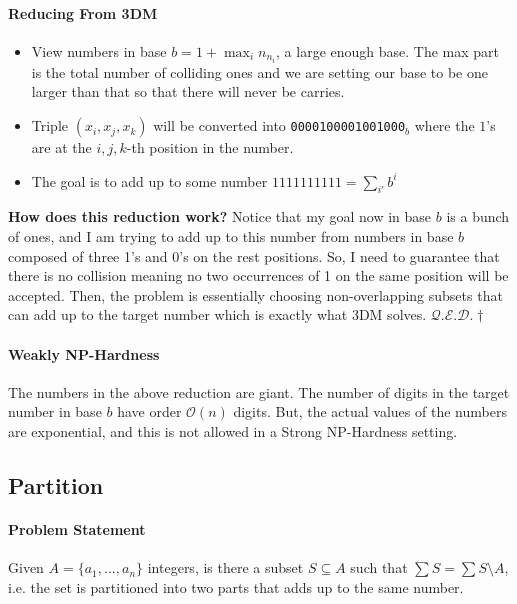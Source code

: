 \documentclass[10pt]{article}
\newcommand{\qed}{\hfill $\mathcal{Q}.\mathcal{E}.\mathcal{D}.\dagger$}
\begin{document}
\paragraph{Reducing From 3DM}
\begin{itemize}
    \item View numbers in base $b = 1 + \max_i n_{n_i}$, a large enough base. The max part is the total number of colliding ones and we are setting our base to be one larger than that so that there will never be carries. 
    \item Triple $(x_i, x_j, x_k)$ will be converted into \texttt{0000100001001000$_b$} where the $1$'s are at the $i,j,k$-th position in the number.
    \item The goal is to add up to some number $1111111111 = \sum_{i'} b^{i}$
\end{itemize}
\textbf{How does this reduction work?} Notice that my goal now in base $b$ is a bunch of ones, and I am trying to add up to this number from numbers in base $b$ composed of three 1's and 0's on the rest positions. So, I need to guarantee that there is no collision meaning no two occurrences of 1 on the same position will be accepted. Then, the problem is essentially choosing non-overlapping subsets that can add up to the target number which is exactly what 3DM solves. \qed

\paragraph{Weakly NP-Hardness} The numbers in the above reduction are giant. The number of digits in the target number in base $b$ have order $\mathcal{O}(n)$ digits. But, the actual values of the numbers are exponential, and this is not allowed in a Strong NP-Hardness setting. 

\subsection{Partition}
\paragraph{Problem Statement} Given $A = \{a_1,...,a_n\}$ integers, is there a subset $S\subseteq A$ such that  $\sum S = \sum S\setminus A$, i.e. the set is partitioned into two parts that adds up to the same number.
\end{document}
